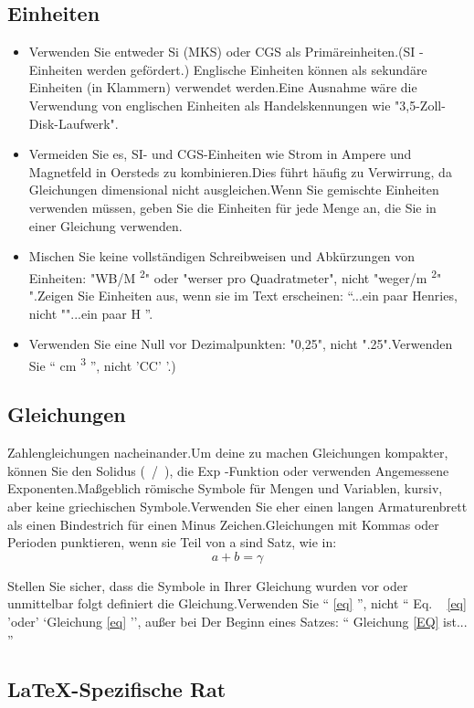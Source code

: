 \documentclass[conference]{IEEEtran}
\begin{document}
\subsection{Einheiten}
\begin{itemize}
\item Verwenden Sie entweder Si (MKS) oder CGS als Primäreinheiten.(SI -Einheiten werden gefördert.) Englische Einheiten können als sekundäre Einheiten (in Klammern) verwendet werden.Eine Ausnahme wäre die Verwendung von englischen Einheiten als Handelskennungen wie "3,5-Zoll-Disk-Laufwerk".
\item Vermeiden Sie es, SI- und CGS-Einheiten wie Strom in Ampere und Magnetfeld in Oersteds zu kombinieren.Dies führt häufig zu Verwirrung, da Gleichungen dimensional nicht ausgleichen.Wenn Sie gemischte Einheiten verwenden müssen, geben Sie die Einheiten für jede Menge an, die Sie in einer Gleichung verwenden.
\item Mischen Sie keine vollständigen Schreibweisen und Abkürzungen von Einheiten: "WB/M \textsuperscript{2}" oder "werser pro Quadratmeter", nicht "weger/m \textsuperscript{2}" ".Zeigen Sie Einheiten aus, wenn sie im Text erscheinen: ``...ein paar Henries, nicht ""...ein paar H ''.
\item Verwenden Sie eine Null vor Dezimalpunkten: "0,25", nicht ".25".Verwenden Sie `` cm \textsuperscript{3} '', nicht 'CC' '.) \end{itemize}

\subsection{Gleichungen}
Zahlengleichungen nacheinander.Um deine zu machen
Gleichungen kompakter, können Sie den Solidus (~/~), die Exp -Funktion oder verwenden
Angemessene Exponenten.Maßgeblich römische Symbole für Mengen und Variablen, kursiv,
aber keine griechischen Symbole.Verwenden Sie eher einen langen Armaturenbrett als einen Bindestrich für einen Minus
Zeichen.Gleichungen mit Kommas oder Perioden punktieren, wenn sie Teil von a sind
Satz, wie in:
\begin{equation}
a+b=\gamma\label{eq}
\end{equation}

Stellen Sie sicher, dass die
Symbole in Ihrer Gleichung wurden vor oder unmittelbar folgt definiert
die Gleichung.Verwenden Sie `` \eqref{eq} '', nicht `` Eq. ~ \eqref{eq} 'oder' `Gleichung \eqref{eq} '', außer bei
Der Beginn eines Satzes: `` Gleichung \eqref{EQ} ist... '' \subsection{\LaTeX -Spezifische Rat}
\end{document}
